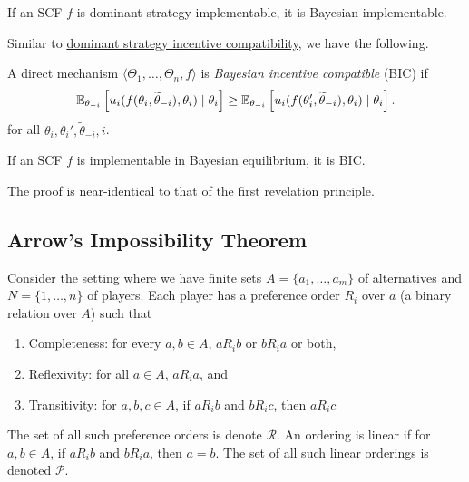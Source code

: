 	\begin{fprop}
		If an SCF $f$ is dominant strategy implementable, it is Bayesian implementable.
	\end{fprop}

	Similar to \hyperref[def: dsic]{dominant strategy incentive compatibility}, we have the following.

	\begin{fdef}
		\label{def: bic}
		A direct mechanism $\langle \Theta_1,\ldots,\Theta_n,f\rangle$ is \emph{Bayesian incentive compatible} (BIC) if
		\begin{equation}
			\label{eqn: dsic}
			\mathbb{E}_{\theta_{-i}} \left[ u_i(f(\theta_i,\widetilde{\theta}_{-i}),\theta_i) \mid \theta_i \right] \ge \mathbb{E}_{\theta_{-i}} \left[ u_i(f(\theta_i',\widetilde{\theta}_{-i}),\theta_i) \mid \theta_i \right].
		\end{equation}
		for all $\theta_i,\theta_i',\widetilde{\theta}_{-i},i$.
	\end{fdef}

	\begin{ftheo}
		If an SCF $f$ is implementable in Bayesian equilibrium, it is BIC.
	\end{ftheo}

	The proof is near-identical to that of the first revelation principle.

\subsection{Arrow's Impossibility Theorem}

	Consider the setting where we have finite sets $A = \{a_1,\ldots,a_m\}$ of alternatives and $N = \{1,\ldots,n\}$ of players. Each player has a preference order $R_i$ over $a$ (a binary relation over $A$) such that
	\begin{enumerate}
		\item Completeness: for every $a,b \in A$, $a R_i b$ or $b R_i a$ or both,
		\item Reflexivity: for all $a \in A$, $a R_i a$, and
		\item Transitivity: for $a,b,c \in A$, if $a R_i b$ and $b R_i c$, then $a R_i c$
	\end{enumerate}
	The set of all such preference orders is denote $\mathcal{R}$. An ordering is linear if for $a,b \in A$, if $aR_i b$ and $bR_i a$, then $a = b$. The set of all such linear orderings is denoted $\mathcal{P}$.\\

